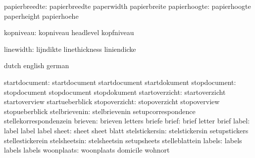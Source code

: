                 papierbreedte:  papierbreedte                paperwidth 
                                papierbreite
                 papierhoogte:  papierhoogte                 paperheight 
                                papierhoehe
                                
                    kopniveau:  kopniveau                    headlevel 
                                kopfniveau

                    linewidth:  lijndikte                    linethickness
                                liniendicke

\stopcommands




\startcommands                  dutch                        english
                                german

                startdocument:  startdocument                startdocument
                                startdokument
                 stopdocument:  stopdocument                 stopdocument
                                stopdokument
               startoverzicht:  startoverzicht               startoverview
                                startueberblick
                stopoverzicht:  stopoverzicht                stopoverview
                                stopueberblick
                stelbrievenin:  stelbrievenin                setupcorrespondence
                                stellekorrespondenzein
                      brieven:  brieven                      letters
                                briefe
                        brief:  brief                        letter
                                brief
                        label:  label                        label
                                label
                        sheet:  sheet                        sheet
                                blatt
               stelstickersin:  stelstickersin               setupstickers
                                stellestickerein
                 stelsheetsin:  stelsheetsin                 setupsheets
                                stelleblattein
                       labels:  labels                       labels
                                labels
                   woonplaats:  woonplaats                   domicile
                                wohnort

\stopcommands


\endinput
